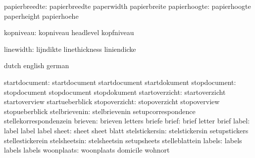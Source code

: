                 papierbreedte:  papierbreedte                paperwidth 
                                papierbreite
                 papierhoogte:  papierhoogte                 paperheight 
                                papierhoehe
                                
                    kopniveau:  kopniveau                    headlevel 
                                kopfniveau

                    linewidth:  lijndikte                    linethickness
                                liniendicke

\stopcommands




\startcommands                  dutch                        english
                                german

                startdocument:  startdocument                startdocument
                                startdokument
                 stopdocument:  stopdocument                 stopdocument
                                stopdokument
               startoverzicht:  startoverzicht               startoverview
                                startueberblick
                stopoverzicht:  stopoverzicht                stopoverview
                                stopueberblick
                stelbrievenin:  stelbrievenin                setupcorrespondence
                                stellekorrespondenzein
                      brieven:  brieven                      letters
                                briefe
                        brief:  brief                        letter
                                brief
                        label:  label                        label
                                label
                        sheet:  sheet                        sheet
                                blatt
               stelstickersin:  stelstickersin               setupstickers
                                stellestickerein
                 stelsheetsin:  stelsheetsin                 setupsheets
                                stelleblattein
                       labels:  labels                       labels
                                labels
                   woonplaats:  woonplaats                   domicile
                                wohnort

\stopcommands


\endinput
